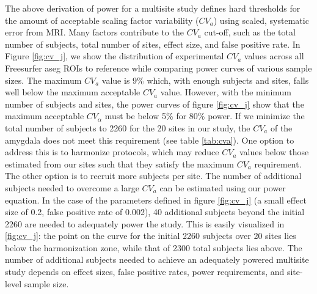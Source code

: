 The above derivation of power for a multisite study defines hard thresholds for the amount of acceptable scaling factor variability ($CV_{a}$) using scaled, systematic error from MRI. Many factors contribute to the $CV_{a}$ cut-off, such as the total number of subjects, total number of sites, effect size, and false positive rate. In Figure \ref{fig:cv_j}, we show the distribution of experimental $CV_{a}$ values across all Freesurfer aseg ROIs to reference while comparing power curves of various sample sizes. The maximum $CV_{a}$ value is 9\% which, with enough subjects and sites, falls well below the maximum acceptable $CV_{a}$ value. However, with the minimum number of subjects and sites, the power curves of figure \ref{fig:cv_j} show that the maximum acceptable $CV_{\alpha}$ must be below 5\% for 80\% power. If we minimize the total number of subjects to 2260 for the 20 sites in our study, the $CV_{a}$ of the amygdala does not meet this requirement (see table \ref{tab:cva}). One option to address this is to harmonize protocols, which may reduce $CV_a$ values below those estimated from our sites such that they satisfy the maximum $CV_{a}$ requirement. The other option is to recruit more subjects per site. The number of additional subjects needed to overcome a large $CV_a$ can be estimated using our power equation. In the case of the parameters defined in figure \ref{fig:cv_j} (a small effect size of 0.2, false positive rate of 0.002), 40 additional subjects beyond the initial 2260 are needed to adequately power the study. This is easily visualized in \ref{fig:cv_j}: the point on the curve for the initial 2260 subjects over 20 sites lies below the harmonization zone, while that of 2300 total subjects lies above. The number of additional subjects needed to achieve an adequately powered multisite study depends on effect sizes, false positive rates, power requirements, and site-level sample size. 

